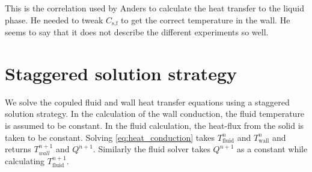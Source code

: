 \documentclass{article}
\begin{document}
This is the correlation used by Anders to calculate the heat transfer to the liquid phase. He needed to tweak $C_{\text{s,f}}$ to get the correct temperature in the wall. He seems to say that it does not describe the different experiments so well.
\section{Staggered solution strategy}
We solve the copuled fluid and wall heat transfer equations using a staggered solution strategy. In the calculation of the wall conduction, the fluid temperature is assumed to be constant. In the fluid calculation, the heat-flux from the solid is taken to be constant. Solving \cref{eq:heat_conduction} takes $T_{\text{fluid}}^n$ and $T_{\text{wall}}^n$ and returns $T_{wall}^{n+1}$ and $Q^{n+1}$. Similarly the fluid solver takes $Q^{n+1}$ as a constant while calculating $T_{\text{fluid}}^{n+1}$.
\end{document}
